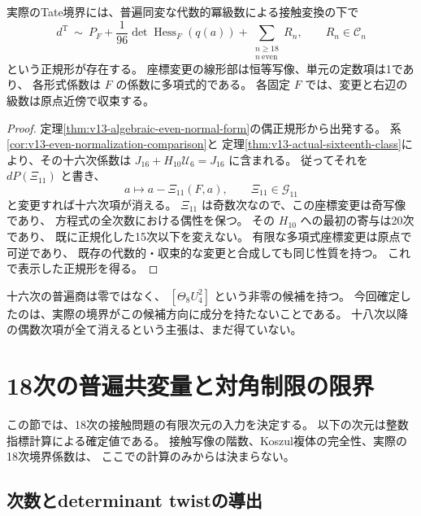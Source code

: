 \begin{theorem}
\label{thm:v13-eighteenth-even-normal-form}
実際のTate境界には、普遍同変な代数的冪級数による接触変換の下で
\begin{equation}\label{eq:v13-eighteenth-even-normal-form}
 \boxed{\displaystyle
 d^{\mathrm T}\ \sim\
 P_F+\frac1{96}\det\operatorname{Hess}_F(q(a))
       +\sum_{\substack{n\ge18\\n\ \mathrm{even}}}R_n,
 \qquad R_n\in\mathcal C_n
 }
\end{equation}
という正規形が存在する。
座標変更の線形部は恒等写像、単元の定数項は1であり、
各形式係数は $F$ の係数に多項式的である。
各固定 $F$ では、変更と右辺の級数は原点近傍で収束する。
\end{theorem}
\begin{proof}
定理\ref{thm:v13-algebraic-even-normal-form}の偶正規形から出発する。
系\ref{cor:v13-even-normalization-comparison}と
定理\ref{thm:v13-actual-sixteenth-class}により、その十六次係数は
$J_{16}+H_{10}\mathcal U_6=J_{16}$ に含まれる。
従ってそれを $dP(\Xi_{11})$ と書き、
\[
 a\longmapsto a-\Xi_{11}(F,a),\qquad \Xi_{11}\in\mathcal G_{11}
\]
と変更すれば十六次項が消える。
$\Xi_{11}$ は奇数次なので、この座標変更は奇写像であり、
方程式の全次数における偶性を保つ。
その $H_{10}$ への最初の寄与は20次であり、
既に正規化した15次以下を変えない。
有限な多項式座標変更は原点で可逆であり、
既存の代数的・収束的な変更と合成しても同じ性質を持つ。
これで表示した正規形を得る。
\end{proof}

十六次の普遍商は零ではなく、
$[\Theta_8U_4^2]$ という非零の候補を持つ。
今回確定したのは、実際の境界がこの候補方向に成分を持たないことである。
十八次以降の偶数次項が全て消えるという主張は、まだ得ていない。


\clearpage
\section{18次の普遍共変量と対角制限の限界}
\label{sec:v14-eighteenth-characters}

この節では、18次の接触問題の有限次元の入力を決定する。
以下の次元は整数指標計算による確定値である。
接触写像の階数、Koszul複体の完全性、実際の18次境界係数は、
ここでの計算のみからは決まらない。

\subsection{次数とdeterminant twistの導出}


